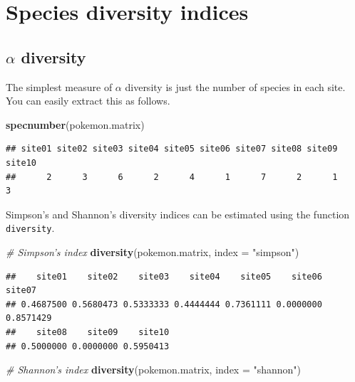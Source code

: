 \documentclass[]{book}
\newenvironment{Shaded}{\begin{snugshade}}{\end{snugshade}}
\newcommand{\KeywordTok}[1]{\textcolor[rgb]{0.13,0.29,0.53}{\textbf{{#1}}}}
\newcommand{\DataTypeTok}[1]{\textcolor[rgb]{0.13,0.29,0.53}{{#1}}}
\newcommand{\StringTok}[1]{\textcolor[rgb]{0.31,0.60,0.02}{{#1}}}
\newcommand{\CommentTok}[1]{\textcolor[rgb]{0.56,0.35,0.01}{\textit{{#1}}}}
\newcommand{\NormalTok}[1]{{#1}}
\theoremstyle{definition}
\theoremstyle{definition}
\theoremstyle{definition}
\theoremstyle{remark}
\begin{document}
\section{Species diversity indices}\label{species-diversity-indices}

\subsection{\texorpdfstring{\(\alpha\)
diversity}{\textbackslash{}alpha diversity}}\label{alpha-diversity}

The simplest measure of \(\alpha\) diversity is just the number of
species in each site. You can easily extract this as follows.

\begin{Shaded}
\begin{Highlighting}[]
\KeywordTok{specnumber}\NormalTok{(pokemon.matrix)}
\end{Highlighting}
\end{Shaded}

\begin{verbatim}
## site01 site02 site03 site04 site05 site06 site07 site08 site09 site10 
##      2      3      6      2      4      1      7      2      1      3
\end{verbatim}

Simpson's and Shannon's diversity indices can be estimated using the
function \texttt{diversity}.

\begin{Shaded}
\begin{Highlighting}[]
\CommentTok{# Simpson's index}
\KeywordTok{diversity}\NormalTok{(pokemon.matrix, }\DataTypeTok{index =} \StringTok{"simpson"}\NormalTok{)}
\end{Highlighting}
\end{Shaded}

\begin{verbatim}
##    site01    site02    site03    site04    site05    site06    site07 
## 0.4687500 0.5680473 0.5333333 0.4444444 0.7361111 0.0000000 0.8571429 
##    site08    site09    site10 
## 0.5000000 0.0000000 0.5950413
\end{verbatim}

\begin{Shaded}
\begin{Highlighting}[]
\CommentTok{# Shannon's index}
\KeywordTok{diversity}\NormalTok{(pokemon.matrix, }\DataTypeTok{index =} \StringTok{"shannon"}\NormalTok{)}
\end{Highlighting}
\end{Shaded}
\end{document}

